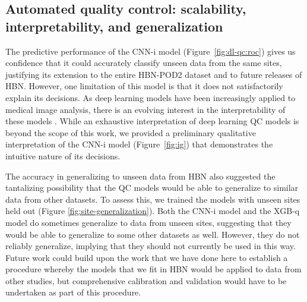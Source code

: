 \documentclass[9pt,lineno]{elife}
\begin{document}
\subsection{Automated quality control: scalability, interpretability, and generalization}

The predictive
performance of the CNN-i model (Figure~\ref{fig:dl-qc:roc}) gives
us confidence that it could accurately classify unseen data from the same sites, justifying its
extension to the entire HBN-POD2 dataset and to future releases of HBN. However, one limitation of this model is that it
does not satisfactorily explain its decisions. As deep learning models have been increasingly
applied to medical image analysis, there is an evolving interest in the
interpretability of these models \citep{salahuddin2022transparency, lipton2017doctor,
Zech2018-ki, Ghassemi2021-zg}. While an
exhaustive interpretation of deep learning QC models is beyond the scope of this
work, we provided a preliminary qualitative interpretation of the CNN-i model
(Figure~\ref{fig:ig}) that demonstrates the intuitive nature of its decisions. 

The accuracy in generalizing to unseen data from HBN also suggested the tantalizing possibility that the QC models would be able to generalize to similar data from other datasets. To assess this, we trained the models with unseen sites held out (Figure \ref{fig:site-generalization}). Both the CNN-i model and the XGB-q model do sometimes generalize to data from unseen sites, suggesting that they would be able to generalize to some other datasets as well. However, they do not reliably generalize, implying that they should not currently be used in this way. Future work could build upon the work that we have done here to establish a procedure whereby the models that we fit in HBN would be applied to data from other studies, but comprehensive calibration and validation would have to be undertaken as part of this procedure. 
\end{document}
